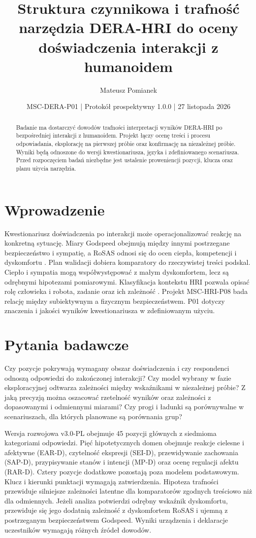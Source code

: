 \documentclass[11pt,a4paper]{article}
\title{Struktura czynnikowa i trafność narzędzia DERA-HRI do oceny doświadczenia interakcji z humanoidem}
\author{Mateusz Pomianek}
\date{MSC-DERA-P01 | Protokół prospektywny 1.0.0 | 27 listopada 2026}
\begin{document}
\maketitle
\begin{abstract}
Badanie ma dostarczyć dowodów trafności interpretacji wyników DERA-HRI po bezpośredniej interakcji z humanoidem. Projekt łączy ocenę treści i procesu odpowiadania, eksplorację na pierwszej próbie oraz konfirmację na niezależnej próbie. Wyniki będą odnoszone do wersji kwestionariusza, języka i zdefiniowanego scenariusza. Przed rozpoczęciem badań niezbędne jest ustalenie proweniencji pozycji, klucza oraz planu użycia narzędzia.
\end{abstract}
\section{Wprowadzenie}
Kwestionariusz doświadczenia po interakcji może operacjonalizować reakcję na konkretną sytuację. Miary Godspeed obejmują między innymi postrzegane bezpieczeństwo i sympatię, a RoSAS odnosi się do ocen ciepła, kompetencji i dyskomfortu \citep{bartneck,carpinella}. Plan walidacji dobiera komparatory do rzeczywistej treści podskal. Ciepło i sympatia mogą współwystępować z małym dyskomfortem, lecz są odrębnymi hipotezami pomiarowymi. Klasyfikacja kontekstu HRI pozwala opisać rolę człowieka i robota, zadanie oraz ich zależność \citep{onnasch}. Projekt MSC-HRI-P08 bada relację między subiektywnym a fizycznym bezpieczeństwem. P01 dotyczy znaczenia i jakości wyników kwestionariusza w zdefiniowanym użyciu.

\section{Pytania badawcze}
Czy pozycje pokrywają wymagany obszar doświadczenia i czy respondenci odnoszą odpowiedzi do zakończonej interakcji? Czy model wybrany w fazie eksploracyjnej odtwarza zależności między wskaźnikami w niezależnej próbie? Z jaką precyzją można oszacować rzetelność wyników oraz zależności z dopasowanymi i odmiennymi miarami? Czy progi i ładunki są porównywalne w scenariuszach, dla których planowane są porównania grup?

Wersja rozwojowa v3.0-PL obejmuje 45 pozycji głównych z siedmioma kategoriami odpowiedzi. Pięć hipotetycznych domen obejmuje reakcje cielesne i afektywne (EAR-D), czytelność ekspresji (SEI-D), przewidywanie zachowania (SAP-D), przypisywanie stanów i intencji (MP-D) oraz ocenę regulacji afektu (RAR-D). Cztery pozycje dodatkowe pozostają poza modelem podstawowym. Klucz i kierunki punktacji wymagają zatwierdzenia. Hipoteza trafności przewiduje silniejsze zależności latentne dla komparatorów zgodnych treściowo niż dla odmiennych. Jeżeli analiza potwierdzi odrębny wskaźnik dyskomfortu, przewiduje się jego dodatnią zależność z dyskomfortem RoSAS i ujemną z postrzeganym bezpieczeństwem Godspeed. Wyniki urządzenia i deklaracje uczestników wymagają różnych źródeł dowodów.
\end{document}
